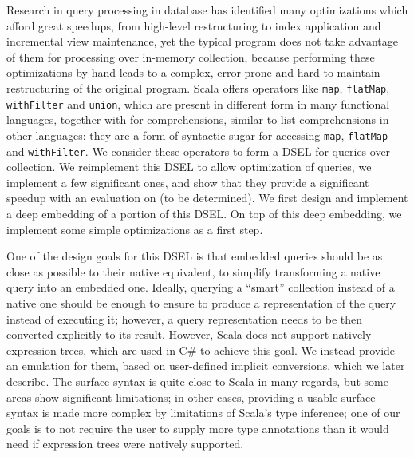 \documentclass[preprint,authoryear,10pt]{sigplanconf}
\begin{document}
Research in query processing in database has identified many
optimizations which afford great speedups, from high-level restructuring
to index application and incremental view maintenance, yet the typical
program does not take advantage of them for processing over in-memory
collection, because performing these optimizations by hand leads to a
complex, error-prone and hard-to-maintain restructuring of the original
program. Scala offers operators like \texttt{map}, \texttt{flatMap},
\texttt{withFilter} and \texttt{union}, which are present in different
form in many functional languages, together with for comprehensions,
similar to list comprehensions in other languages: they are a form of
syntactic sugar for accessing \texttt{map}, \texttt{flatMap} and
\texttt{withFilter}. We consider these operators to form a DSEL for
queries over collection. We reimplement this DSEL to allow optimization
of queries, we implement a few significant ones, and show that they
provide a significant speedup with an evaluation on (to be determined).
We first design and implement a deep embedding of a portion of this
DSEL. On top of this deep embedding, we implement some simple
optimizations as a first step.

One of the design goals for this DSEL is that embedded queries should be
as close as possible to their native equivalent, to simplify
transforming a native query into an embedded one. Ideally, querying a
``smart'' collection instead of a native one should be enough to ensure
to produce a representation of the query instead of executing it;
however, a query representation needs to be then converted explicitly to
its result. However, Scala does not support natively expression trees,
which are used in C\# to achieve this goal. We instead provide an
emulation for them, based on user-defined implicit conversions, which we
later describe. The surface syntax is quite close to Scala in many
regards, but some areas show significant limitations; in other cases,
providing a usable surface syntax is made more complex by limitations of
Scala's type inference; one of our goals is to not require the user to
supply more type annotations than it would need if expression trees were
natively supported.

\end{document}

